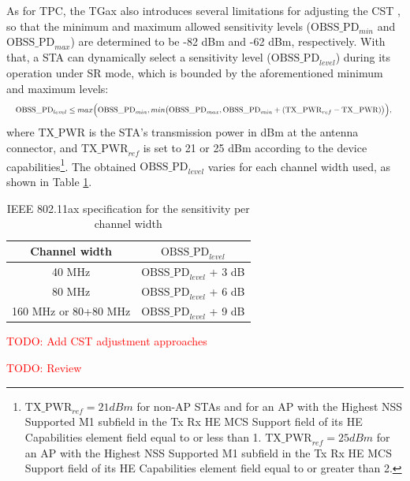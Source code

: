 \documentclass[12pt, a4paper,twoside]{tesi_upf}
\begin{document}
			As for TPC, the TGax also introduces several limitations for adjusting the CST \cite{tgax2016draft}, so that the minimum and maximum allowed sensitivity levels ($\text{OBSS\_PD}_{min}$ and $\text{OBSS\_PD}_{max}$) are determined to be -82 dBm and -62 dBm, respectively. With that, a STA can dynamically select a sensitivity level ($\text{OBSS\_PD}_{level}$) during its operation under SR mode, which is bounded by the aforementioned minimum and maximum levels:			
			\begin{equation}
				\resizebox{1\hsize}{!}{$\text{OBSS\_PD}_{level} \leq max\Big(\text{OBSS\_PD}_{min}, min\big(\text{OBSS\_PD}_{max}, \text{OBSS\_PD}_{min} + (\text{TX\_PWR}_{ref}-\text{TX\_PWR})\big)\Big),$
				\nonumber}				
			\end{equation}
			where $\text{TX\_PWR}$ is the STA's transmission power in dBm at the antenna connector, and $\text{TX\_PWR}_{ref}$ is set to 21 or 25 dBm according to the device capabilities\footnote{$\text{TX\_PWR}_{ref} = 21 dBm$ for non-AP STAs and for an AP with the Highest NSS Supported M1 subfield in the Tx Rx HE MCS Support field of its HE Capabilities element field equal to or less than 1. $\text{TX\_PWR}_{ref} = 25 dBm$ for an AP with the Highest NSS Supported M1 subfield in the Tx Rx HE MCS Support field of its HE Capabilities element field equal to or greater than 2.}.
			The obtained $\text{OBSS\_PD}_{level}$ varies for each channel width used, as shown in Table \ref{tbl:sensitivity_channel_width}.
			\begin{table}[h!]
				\centering
				\begin{tabular}{|c|l|}
					\hline
					\textbf{Channel width} & \multicolumn{1}{c|}{\textbf{$\text{OBSS\_PD}_{level}$}} \\ \hline
					40 MHz                 & $\text{OBSS\_PD}_{level}$ + 3 dB                        \\ \hline
					80 MHz                 & $\text{OBSS\_PD}_{level}$ + 6 dB                        \\ \hline
					160 MHz or 80+80 MHz   & $\text{OBSS\_PD}_{level}$ + 9 dB                        \\ \hline
				\end{tabular}
				\caption{IEEE 802.11ax specification for the sensitivity per channel width}
				\label{tbl:sensitivity_channel_width}
			\end{table}			
	
	
			\textcolor{red}{TODO: Add CST adjustment approaches}
			
			\textcolor{red}{TODO: Review \cite{afifi2016throughput}}
					
\end{document}
